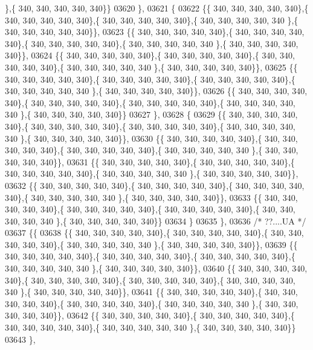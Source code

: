 \begin{DoxyCode}
      \},\{ 340, 340, 340, 340, 340\}\}
03620 \},
03621 \{
03622 \{\{ 340, 340, 340, 340, 340\},\{ 340, 340, 340, 340, 340\},\{ 340, 340, 340, 340, 340\},\{ 340, 340, 340, 340, 340
      \},\{ 340, 340, 340, 340, 340\}\},
03623 \{\{ 340, 340, 340, 340, 340\},\{ 340, 340, 340, 340, 340\},\{ 340, 340, 340, 340, 340\},\{ 340, 340, 340, 340, 340
      \},\{ 340, 340, 340, 340, 340\}\},
03624 \{\{ 340, 340, 340, 340, 340\},\{ 340, 340, 340, 340, 340\},\{ 340, 340, 340, 340, 340\},\{ 340, 340, 340, 340, 340
      \},\{ 340, 340, 340, 340, 340\}\},
03625 \{\{ 340, 340, 340, 340, 340\},\{ 340, 340, 340, 340, 340\},\{ 340, 340, 340, 340, 340\},\{ 340, 340, 340, 340, 340
      \},\{ 340, 340, 340, 340, 340\}\},
03626 \{\{ 340, 340, 340, 340, 340\},\{ 340, 340, 340, 340, 340\},\{ 340, 340, 340, 340, 340\},\{ 340, 340, 340, 340, 340
      \},\{ 340, 340, 340, 340, 340\}\}
03627 \},
03628 \{
03629 \{\{ 340, 340, 340, 340, 340\},\{ 340, 340, 340, 340, 340\},\{ 340, 340, 340, 340, 340\},\{ 340, 340, 340, 340, 340
      \},\{ 340, 340, 340, 340, 340\}\},
03630 \{\{ 340, 340, 340, 340, 340\},\{ 340, 340, 340, 340, 340\},\{ 340, 340, 340, 340, 340\},\{ 340, 340, 340, 340, 340
      \},\{ 340, 340, 340, 340, 340\}\},
03631 \{\{ 340, 340, 340, 340, 340\},\{ 340, 340, 340, 340, 340\},\{ 340, 340, 340, 340, 340\},\{ 340, 340, 340, 340, 340
      \},\{ 340, 340, 340, 340, 340\}\},
03632 \{\{ 340, 340, 340, 340, 340\},\{ 340, 340, 340, 340, 340\},\{ 340, 340, 340, 340, 340\},\{ 340, 340, 340, 340, 340
      \},\{ 340, 340, 340, 340, 340\}\},
03633 \{\{ 340, 340, 340, 340, 340\},\{ 340, 340, 340, 340, 340\},\{ 340, 340, 340, 340, 340\},\{ 340, 340, 340, 340, 340
      \},\{ 340, 340, 340, 340, 340\}\}
03634 \}
03635 \},
03636 \textcolor{comment}{/* ??....UA */}
03637 \{\{
03638 \{\{ 340, 340, 340, 340, 340\},\{ 340, 340, 340, 340, 340\},\{ 340, 340, 340, 340, 340\},\{ 340, 340, 340, 340, 340
      \},\{ 340, 340, 340, 340, 340\}\},
03639 \{\{ 340, 340, 340, 340, 340\},\{ 340, 340, 340, 340, 340\},\{ 340, 340, 340, 340, 340\},\{ 340, 340, 340, 340, 340
      \},\{ 340, 340, 340, 340, 340\}\},
03640 \{\{ 340, 340, 340, 340, 340\},\{ 340, 340, 340, 340, 340\},\{ 340, 340, 340, 340, 340\},\{ 340, 340, 340, 340, 340
      \},\{ 340, 340, 340, 340, 340\}\},
03641 \{\{ 340, 340, 340, 340, 340\},\{ 340, 340, 340, 340, 340\},\{ 340, 340, 340, 340, 340\},\{ 340, 340, 340, 340, 340
      \},\{ 340, 340, 340, 340, 340\}\},
03642 \{\{ 340, 340, 340, 340, 340\},\{ 340, 340, 340, 340, 340\},\{ 340, 340, 340, 340, 340\},\{ 340, 340, 340, 340, 340
      \},\{ 340, 340, 340, 340, 340\}\}
03643 \},

\end{DoxyCode}
